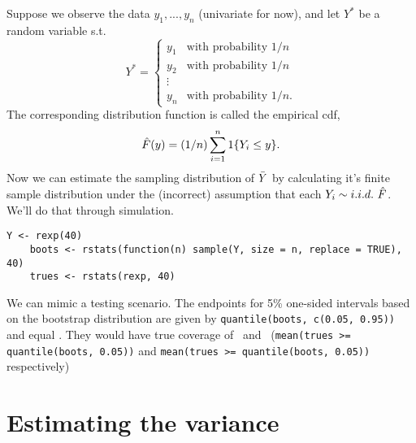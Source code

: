 \begin{itemize}[leftmargin=0pt]
  Suppose we observe the data $y_1,...,y_n$ (univariate for now), and
  let $Y^*$ be a random variable s.t.
  \begin{equation*}
    Y^* =
    \begin{cases}
      y_1 & \text{with probability } 1/n \\
      y_2 & \text{with probability } 1/n \\
      \vdots \\
      y_n & \text{with probability } 1/n.
    \end{cases}
  \end{equation*}
  The corresponding distribution function is called the empirical cdf,
  \begin{equation*}
    \hat{F}(y) = (1/n) \sum_{i=1}^n \operatorname{1}\{ Y_i \leq y \}.
  \end{equation*}
  Now we can estimate the sampling distribution of $\bar{Y}$ by
  calculating it's finite sample distribution under the (incorrect)
  assumption that each $Y_i \sim i.i.d.\ \hat{F}$.  We'll do that through
  simulation.

  \begin{lstlisting}[gobble=4]
    Y <- rexp(40)
    boots <- rstats(function(n) sample(Y, size = n, replace = TRUE), 40)
    trues <- rstats(rexp, 40)
  \end{lstlisting}

  We can mimic a testing scenario.  The endpoints for 5\% one-sided
  intervals based on the bootstrap distribution are given by
  \lstinline|quantile(boots, c(0.05, 0.95))| and equal \bootquantiles.
  They would have true coverage of \bootleft\ and \bootright\
  (\lstinline|mean(trues >= quantile(boots, 0.05))| and
  \lstinline|mean(trues >= quantile(boots, 0.05))| respectively)

\end{itemize}

\section{Estimating the variance}


